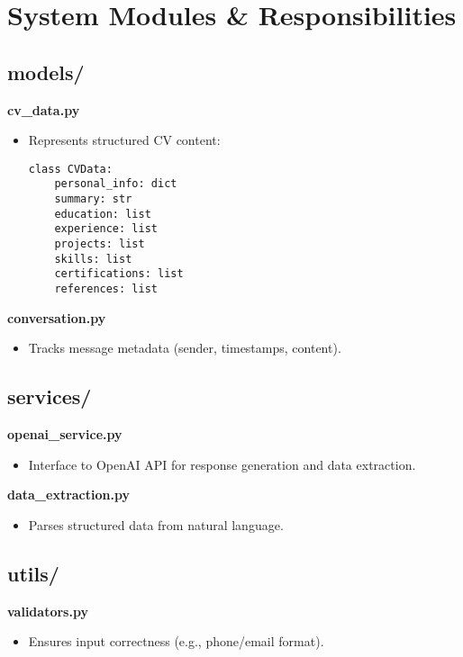 \documentclass[11pt]{article}
\begin{document}
\section{System Modules \& Responsibilities}

\subsection{models/}

\textbf{cv\_data.py}
\begin{itemize}
    \item Represents structured CV content:
    \begin{verbatim}
class CVData:
    personal_info: dict
    summary: str
    education: list
    experience: list
    projects: list
    skills: list
    certifications: list
    references: list
    \end{verbatim}
\end{itemize}

\textbf{conversation.py}
\begin{itemize}
    \item Tracks message metadata (sender, timestamps, content).
\end{itemize}

\subsection{services/}

\textbf{openai\_service.py}
\begin{itemize}
    \item Interface to OpenAI API for response generation and data extraction.
\end{itemize}

\textbf{data\_extraction.py}
\begin{itemize}
    \item Parses structured data from natural language.
\end{itemize}

\subsection{utils/}

\textbf{validators.py}
\begin{itemize}
    \item Ensures input correctness (e.g., phone/email format).
\end{itemize}
\end{document}
